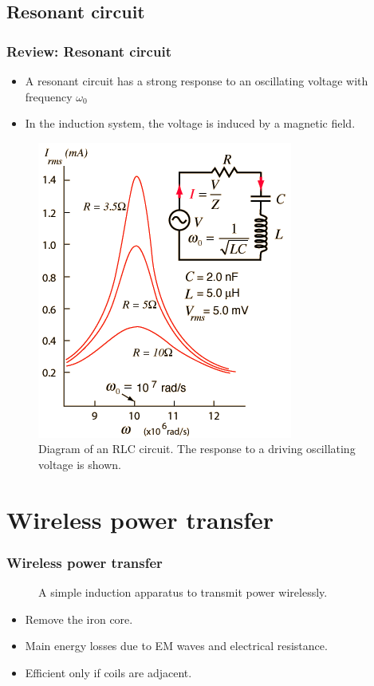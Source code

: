 \documentclass{beamer}
\begin{document}
\subsection{Resonant circuit}
\begin{frame}
  \frametitle{Review: Resonant circuit}
  \begin{itemize}
    \item A resonant circuit has a strong response to an oscillating voltage
      with frequency $\omega_0$
    \item In the induction system, the voltage is induced by a magnetic field.
  \end{itemize}
  \begin{figure}
  \includegraphics[scale=0.3]{images/RLC.png}
  \caption{Diagram of an RLC circuit.
    The response to a driving oscillating voltage is shown.
    \textcite{hyperphysicsresonate}}
  \end{figure}
\end{frame}


\section{Wireless power transfer}
\begin{frame}
  \frametitle{Wireless power transfer}
  \begin{figure}
    
    \caption{A simple induction apparatus to transmit power wirelessly.}
  \end{figure}
  \begin{itemize}
    \item Remove the iron core.
    \item Main energy losses due to EM waves and electrical resistance.
    \item Efficient only if coils are adjacent.
  \end{itemize}
\end{frame}
\end{document}
